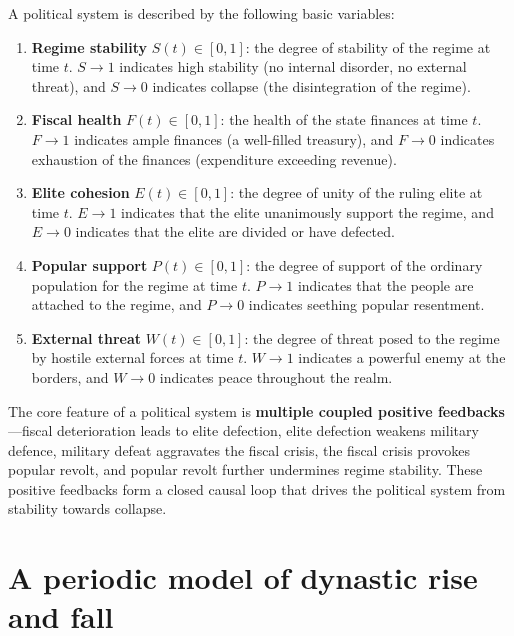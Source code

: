 \begin{definition}\label{def:political_quantities}
A political system is described by the following basic variables:
\begin{enumerate}[label=(\roman*)]
    \item \textbf{Regime stability} $S(t) \in [0,1]$: the degree of stability of the regime at time $t$. $S \to 1$ indicates high stability (no internal disorder, no external threat), and $S \to 0$ indicates collapse (the disintegration of the regime).
    \item \textbf{Fiscal health} $F(t) \in [0,1]$: the health of the state finances at time $t$. $F \to 1$ indicates ample finances (a well-filled treasury), and $F \to 0$ indicates exhaustion of the finances (expenditure exceeding revenue).
    \item \textbf{Elite cohesion} $E(t) \in [0,1]$: the degree of unity of the ruling elite at time $t$. $E \to 1$ indicates that the elite unanimously support the regime, and $E \to 0$ indicates that the elite are divided or have defected.
    \item \textbf{Popular support} $P(t) \in [0,1]$: the degree of support of the ordinary population for the regime at time $t$. $P \to 1$ indicates that the people are attached to the regime, and $P \to 0$ indicates seething popular resentment.
    \item \textbf{External threat} $W(t) \in [0,1]$: the degree of threat posed to the regime by hostile external forces at time $t$. $W \to 1$ indicates a powerful enemy at the borders, and $W \to 0$ indicates peace throughout the realm.
\end{enumerate}
The core feature of a political system is \textbf{multiple coupled positive feedbacks}---fiscal deterioration leads to elite defection, elite defection weakens military defence, military defeat aggravates the fiscal crisis, the fiscal crisis provokes popular revolt, and popular revolt further undermines regime stability. These positive feedbacks form a closed causal loop that drives the political system from stability towards collapse.
\end{definition}

\section{A periodic model of dynastic rise and fall}


